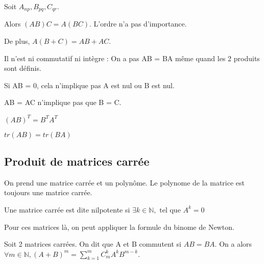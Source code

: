 \documentclass[french]{yLectureNote}
\newcommand{\N}[0]{\mathbb{N}}
\newcommand{\R}[0]{\mathbb{R}}
\newcommand{\tq}[0]{\text{ tel que }}
\newcommand{\mc}{\mathcal}
\begin{document}
\begin{proposition}
Soit \(A_{np}, B_{pq}, C_{qr}\).

Alors \((AB)C=A(BC)\). L'ordre n'a pas d'importance.

De plus, \(A(B+C) = AB+AC\).
\end{proposition}
\begin{proposition}
Il n'est ni commutatif ni intègre : On a pas AB = BA m\^eme quand les 2 produits sont définis.

Si AB = 0, cela n'implique pas A est nul ou B est nul.

AB = AC n'implique pas que B = C.
\end{proposition}
\begin{proposition}
\((AB)^T = B^TA^T\)

\(tr(AB) = tr(BA)\)
\end{proposition}
\subsection{Produit de matrices carrée}
\begin{definition}
On prend une matrice carrée et un polyn\^ome. Le polynome de la matrice est toujours une matrice carrée.
\end{definition}
\begin{definition}
Une matrice carrée est dite nilpotente si \(\exists k\in \N, \tq A^k = 0\)
\end{definition}
\begin{definition}
Pour ces matrices là, on peut appliquer la formule du binome de Newton.

Soit 2 matrices carrées. On dit que A et B commutent si \(AB = BA\). On a alors \(\forall m \in \N, (A+B)^m  = \sum^m_{k=1}C^k_m A^kB^{m-k}\).
\end{definition}
\end{document}
